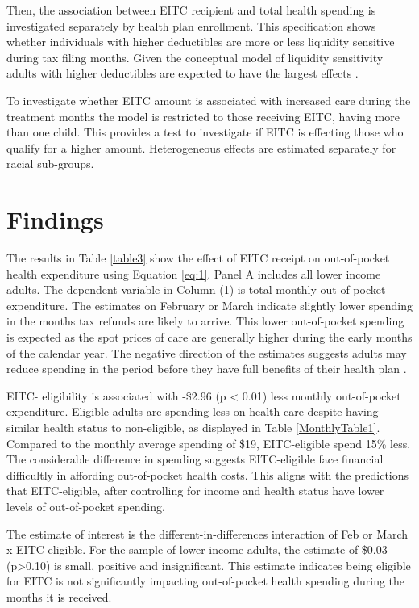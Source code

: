 \documentclass[smallcondensed,referee]{svjour3}
\begin{document}
Then, the association between EITC recipient and total health spending is investigated separately by health plan enrollment. This specification shows whether individuals with higher deductibles are more or less liquidity sensitive during tax filing months. Given the conceptual model of liquidity sensitivity adults with higher deductibles are expected to have the largest effects \cite{gross_liquidity_2020}.


To investigate whether EITC amount is associated with increased care during the treatment months the model is restricted to those receiving EITC, having more than one child. This provides a test to investigate if EITC is effecting those who qualify for a higher amount. Heterogeneous effects are estimated separately for racial sub-groups. 





\section{Findings}

The results in Table \ref{table3} show the effect of EITC receipt on out-of-pocket health expenditure using Equation \ref{eq:1}. Panel A includes all lower income adults. The dependent variable in Column (1) is total monthly out-of-pocket expenditure. The estimates on February or March indicate slightly lower spending in the months tax refunds are likely to arrive. This lower out-of-pocket spending is expected as the spot prices of care are generally higher during the early months of the calendar year. The negative direction of the estimates suggests adults may reduce spending in the period before they have full benefits of their health plan \citep{brot-goldberg_what_2017}.

EITC- eligibility is associated with  -\$2.96 (p < 0.01) less monthly out-of-pocket expenditure. Eligible adults are spending less on health care despite having similar health status to non-eligible, as displayed in Table \ref{MonthlyTable1}. Compared to the monthly average spending of \$19, EITC-eligible spend 15\% less. The considerable difference in spending suggests EITC-eligible face financial difficultly in affording out-of-pocket health costs. This aligns with the predictions that EITC-eligible, after controlling for income and health status have lower levels of out-of-pocket spending.


The estimate of interest is the different-in-differences interaction of Feb or March x EITC-eligible. For the sample of lower income adults, the estimate of \$0.03 (p>0.10) is small, positive and insignificant.  This estimate indicates being eligible for EITC is not significantly impacting out-of-pocket health spending during the months it is received. 
\end{document}
